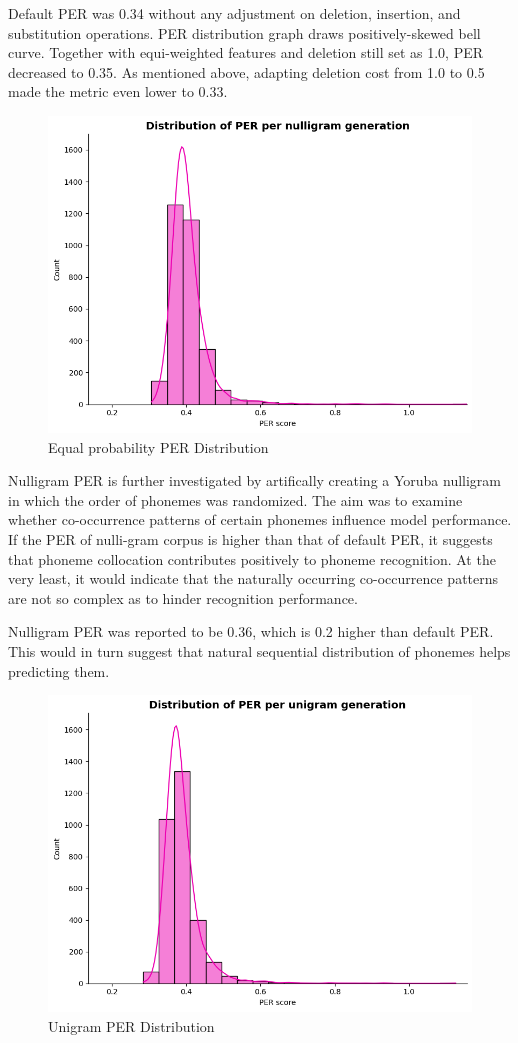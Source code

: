 \documentclass[11pt]{article}
\begin{document}
{Default PER was 0.34 without any adjustment on deletion, insertion, and substitution operations. PER distribution graph draws positively-skewed bell curve. Together with equi-weighted features and deletion still set as 1.0, PER decreased to 0.35. As mentioned above, adapting deletion cost from 1.0 to 0.5 made the metric even lower to 0.33.


\begin{figure}
    \centering
    \includegraphics[width=0.75\linewidth]{nulligram_PER_distribution.png}
    \caption{Equal probability PER Distribution}
    \label{fig:placeholder}
\end{figure}
Nulligram PER is further investigated by artifically creating a Yoruba nulligram in which the order of phonemes was randomized. The aim was to examine whether co-occurrence patterns of certain phonemes influence model performance. If the PER of nulli-gram corpus is higher than that of default PER, it suggests that phoneme collocation contributes positively to phoneme recognition. At the very least, it would indicate that the naturally occurring co-occurrence patterns are not so complex as to hinder recognition performance.

Nulligram PER was reported to be 0.36, which is 0.2 higher than default PER. This would in turn suggest that natural sequential distribution of phonemes helps predicting them.
\begin{figure}
    \centering
    \includegraphics[width=0.75\linewidth]{unigram_PER_distribution.png}
    \caption{Unigram PER Distribution}
    \label{fig:placeholder}
\end{figure}

}
\end{document}
